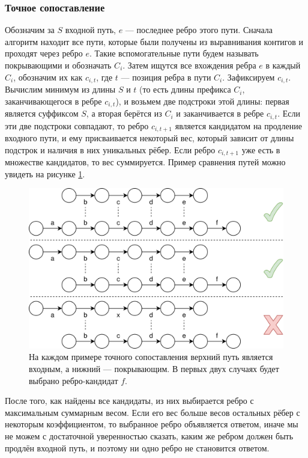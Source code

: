 \documentclass[14pt]{matmex-diploma-custom}
\begin{document}
\subsubsection{Точное сопоставление}
Обозначим за $S$ входной путь, $e$ --- последнее ребро этого пути. Сначала алгоритм находит все пути, которые были получены из выравнивания контигов и проходят через ребро $e$. Такие вспомогательные пути будем называть покрывающими и обозначать $C_i$. Затем ищутся все вхождения ребра $e$ в каждый $C_i$, обозначим их как $c_{i,t}$, где $t$ --- позиция ребра в пути $C_i$. Зафиксируем $c_{i,t}$. Вычислим минимум из длины $S$ и $t$ (то есть длины префикса $C_i$, заканчивающегося в ребре $c_{i,t}$), и возьмем две подстроки этой длины: первая является суффиксом $S$, а вторая берётся из $C_i$ и заканчивается в ребре $c_{i,t}$. Если эти две подстроки совпадают, то ребро $c_{i,t+1}$ является кандидатом на продление входного пути, и ему присваивается некоторый вес, который зависит от длины подстрок и наличия в них уникальных рёбер. Если ребро $c_{i,t+1}$ уже есть в множестве кандидатов, то вес суммируется. Пример сравнения путей можно увидеть на рисунке \ref{fig:ex1}.

\begin{figure}[h]
	\centering
	\includegraphics[scale=0.2]{high_quality_matching.png}
	\caption{На каждом примере точного сопоставления верхний путь является входным, а нижний --- покрывающим. В первых двух случаях будет выбрано ребро-кандидат $f$.}
  	\label{fig:ex1}
\end{figure}

После того, как найдены все кандидаты, из них выбирается ребро с максимальным суммарным весом. Если его вес больше весов остальных рёбер с некоторым коэффициентом, то выбранное ребро объявляется ответом, иначе мы не можем с достаточной уверенностью сказать, каким же ребром должен быть продлён входной путь, и поэтому ни одно ребро не становится ответом. 
\end{document}
